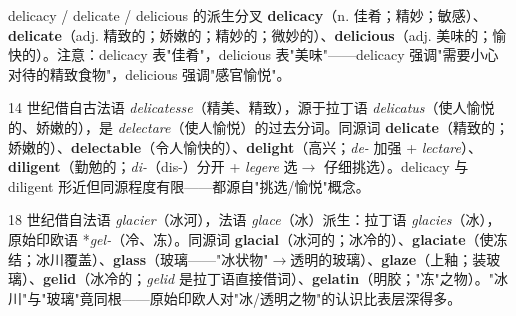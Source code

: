 \documentclass[../main.tex]{subfiles}
\begin{document}

\begin{gram}{delicacy / delicate / delicious 的派生分叉}
\textbf{delicacy}（n. 佳肴；精妙；敏感）、\textbf{delicate}（adj. 精致的；娇嫩的；精妙的；微妙的）、\textbf{delicious}（adj. 美味的；愉快的）。注意：delicacy 表"佳肴"，delicious 表"美味"——delicacy 强调"需要小心对待的精致食物"，delicious 强调"感官愉悦"。
\end{gram}

\begin{origin}
14 世纪借自古法语 \textit{delicatesse}（精美、精致），源于拉丁语 \textit{delicatus}（使人愉悦的、娇嫩的），是 \textit{delectare}（使人愉悦）的过去分词。同源词 \textbf{delicate}（精致的；娇嫩的）、\textbf{delectable}（令人愉快的）、\textbf{delight}（高兴；\textit{de-} 加强 + \textit{lectare}）、\textbf{diligent}（勤勉的；\textit{di-}（dis-）分开 + \textit{legere} 选$\to$ 仔细挑选）。delicacy 与 diligent 形近但同源程度有限——都源自"挑选/愉悦"概念。
\end{origin}




\begin{origin}
18 世纪借自法语 \textit{glacier}（冰河），法语 \textit{glace}（冰）派生：拉丁语 \textit{glacies}（冰），原始印欧语 *\textit{gel-}（冷、冻）。同源词 \textbf{glacial}（冰河的；冰冷的）、\textbf{glaciate}（使冻结；冰川覆盖）、\textbf{glass}（玻璃——"冰状物"$\to$透明的玻璃）、\textbf{glaze}（上釉；装玻璃）、\textbf{gelid}（冰冷的；\textit{gelid} 是拉丁语直接借词）、\textbf{gelatin}（明胶；"冻"之物）。"冰川"与"玻璃"竟同根——原始印欧人对"冰/透明之物"的认识比表层深得多。
\end{origin}


\end{document}
